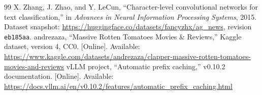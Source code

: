 \begin{thebibliography}{99}
 X. Zhang, J. Zhao, and Y. LeCun, ``Character-level convolutional networks for text classification,'' in \emph{Advances in Neural Information Processing Systems}, 2015. Dataset snapshot: \url{https://huggingface.co/datasets/fancyzhx/ag_news}, revision \texttt{eb185aa}.
 andrezaza, ``Massive Rotten Tomatoes Movies \& Reviews,'' Kaggle dataset, version 4, CC0. [Online]. Available: \url{https://www.kaggle.com/datasets/andrezaza/clapper-massive-rotten-tomatoes-movies-and-reviews}
 vLLM project, ``Automatic prefix caching,'' v0.10.2 documentation. [Online]. Available: \url{https://docs.vllm.ai/en/v0.10.2/features/automatic_prefix_caching.html}
\end{thebibliography}
